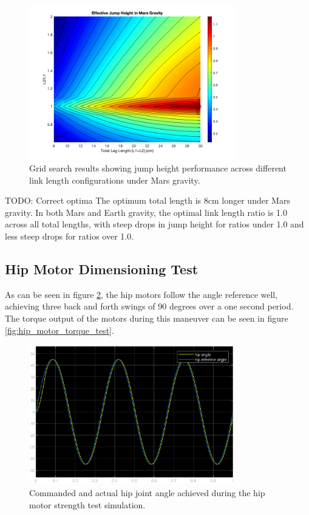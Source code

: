 \begin{figure}[h]
    \centering
    \includegraphics[width=0.8\textwidth]{Images/results/grid_search_results_mars_flat.png}
    \caption{Grid search results showing jump height performance across different link length configurations under Mars gravity.}
    \label{fig:results:grid_search_mars}
\end{figure}

TODO: Correct optima
The optimum total length is 8cm longer under Mars gravity. In both Mars and Earth gravity, the optimal link length ratio is 1.0 across all total lengths, with steep drops in jump height for ratios under 1.0 and less steep drops for ratios over 1.0. 

\subsection{Hip Motor Dimensioning Test}
\label{sec:hip_motor_dimensioning_test}

As can be seen in figure \ref{fig:hip_motor_strength_test}, the hip motors follow the angle reference well, achieving three back and forth swings of 90 degrees over a one second period. The torque output of the motors during this maneuver can be seen in figure \ref{fig:hip_motor_torque_test}. 

\begin{figure}[H]
    \centering
    \includegraphics[width=0.8\textwidth]{Images/attitude_stable_test_result.eps}
    \caption{Commanded and actual hip joint angle achieved during the hip motor strength test simulation. }
    \label{fig:hip_motor_strength_test}
\end{figure}

